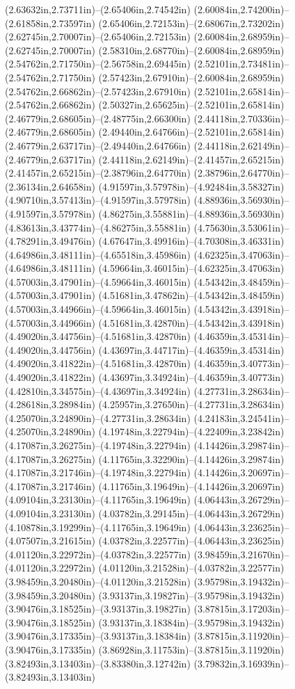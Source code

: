 (2.63632in,2.73711in)--(2.65406in,2.74542in) (2.60084in,2.74200in)--(2.61858in,2.73597in) (2.65406in,2.72153in)--(2.68067in,2.73202in) (2.62745in,2.70007in)--(2.65406in,2.72153in) (2.60084in,2.68959in)--(2.62745in,2.70007in) (2.58310in,2.68770in)--(2.60084in,2.68959in) (2.54762in,2.71750in)--(2.56758in,2.69445in) (2.52101in,2.73481in)--(2.54762in,2.71750in) (2.57423in,2.67910in)--(2.60084in,2.68959in) (2.54762in,2.66862in)--(2.57423in,2.67910in) (2.52101in,2.65814in)--(2.54762in,2.66862in) (2.50327in,2.65625in)--(2.52101in,2.65814in) (2.46779in,2.68605in)--(2.48775in,2.66300in) (2.44118in,2.70336in)--(2.46779in,2.68605in) (2.49440in,2.64766in)--(2.52101in,2.65814in) (2.46779in,2.63717in)--(2.49440in,2.64766in) (2.44118in,2.62149in)--(2.46779in,2.63717in) (2.44118in,2.62149in)--(2.41457in,2.65215in) (2.41457in,2.65215in)--(2.38796in,2.64770in) (2.38796in,2.64770in)--(2.36134in,2.64658in) (4.91597in,3.57978in)--(4.92484in,3.58327in) (4.90710in,3.57413in)--(4.91597in,3.57978in) (4.88936in,3.56930in)--(4.91597in,3.57978in) (4.86275in,3.55881in)--(4.88936in,3.56930in) (4.83613in,3.43774in)--(4.86275in,3.55881in) (4.75630in,3.53061in)--(4.78291in,3.49476in) (4.67647in,3.49916in)--(4.70308in,3.46331in) (4.64986in,3.48111in)--(4.65518in,3.45986in) (4.62325in,3.47063in)--(4.64986in,3.48111in) (4.59664in,3.46015in)--(4.62325in,3.47063in) (4.57003in,3.47901in)--(4.59664in,3.46015in) (4.54342in,3.48459in)--(4.57003in,3.47901in) (4.51681in,3.47862in)--(4.54342in,3.48459in) (4.57003in,3.44966in)--(4.59664in,3.46015in) (4.54342in,3.43918in)--(4.57003in,3.44966in) (4.51681in,3.42870in)--(4.54342in,3.43918in) (4.49020in,3.44756in)--(4.51681in,3.42870in) (4.46359in,3.45314in)--(4.49020in,3.44756in) (4.43697in,3.44717in)--(4.46359in,3.45314in) (4.49020in,3.41822in)--(4.51681in,3.42870in) (4.46359in,3.40773in)--(4.49020in,3.41822in) (4.43697in,3.34924in)--(4.46359in,3.40773in) (4.42810in,3.34575in)--(4.43697in,3.34924in) (4.27731in,3.28634in)--(4.28618in,3.28984in) (4.25957in,3.27650in)--(4.27731in,3.28634in) (4.25070in,3.24890in)--(4.27731in,3.28634in) (4.24183in,3.24541in)--(4.25070in,3.24890in) (4.19748in,3.22794in)--(4.22409in,3.23842in) (4.17087in,3.26275in)--(4.19748in,3.22794in) (4.14426in,3.29874in)--(4.17087in,3.26275in) (4.11765in,3.32290in)--(4.14426in,3.29874in) (4.17087in,3.21746in)--(4.19748in,3.22794in) (4.14426in,3.20697in)--(4.17087in,3.21746in) (4.11765in,3.19649in)--(4.14426in,3.20697in) (4.09104in,3.23130in)--(4.11765in,3.19649in) (4.06443in,3.26729in)--(4.09104in,3.23130in) (4.03782in,3.29145in)--(4.06443in,3.26729in) (4.10878in,3.19299in)--(4.11765in,3.19649in) (4.06443in,3.23625in)--(4.07507in,3.21615in) (4.03782in,3.22577in)--(4.06443in,3.23625in) (4.01120in,3.22972in)--(4.03782in,3.22577in) (3.98459in,3.21670in)--(4.01120in,3.22972in) (4.01120in,3.21528in)--(4.03782in,3.22577in) (3.98459in,3.20480in)--(4.01120in,3.21528in) (3.95798in,3.19432in)--(3.98459in,3.20480in) (3.93137in,3.19827in)--(3.95798in,3.19432in) (3.90476in,3.18525in)--(3.93137in,3.19827in) (3.87815in,3.17203in)--(3.90476in,3.18525in) (3.93137in,3.18384in)--(3.95798in,3.19432in) (3.90476in,3.17335in)--(3.93137in,3.18384in) (3.87815in,3.11920in)--(3.90476in,3.17335in) (3.86928in,3.11753in)--(3.87815in,3.11920in) (3.82493in,3.13403in)--(3.83380in,3.12742in) (3.79832in,3.16939in)--(3.82493in,3.13403in) 